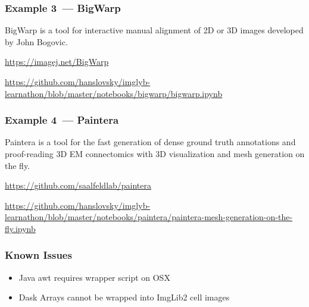 \documentclass[%
]{beamer}
\newcommand{\urlScrSz}[1]{\scriptsize\url{#1}}
\begin{document}
\begin{frame}
    \frametitle{Example 3~--- BigWarp}
    BigWarp is a tool for interactive manual alignment of 2D or 3D images developed by John Bogovic.

    \urlScrSz{https://imagej.net/BigWarp}

    \urlScrSz{https://github.com/hanslovsky/imglyb-learnathon/blob/master/notebooks/bigwarp/bigwarp.ipynb}
\end{frame}

\begin{frame}
    \frametitle{Example 4~--- Paintera}
    Paintera is a tool for the fast generation of dense ground truth annotations and proof-reading
    3D EM connectomics with 3D visualization and mesh generation on the fly.

    \urlScrSz{https://github.com/saalfeldlab/paintera}

    \urlScrSz{https://github.com/hanslovsky/imglyb-learnathon/blob/master/notebooks/paintera/paintera-mesh-generation-on-the-fly.ipynb}
\end{frame}

\begin{frame}
    \frametitle{Known Issues}
    \begin{itemize}
          \item Java awt requires wrapper script on OSX
          \item Dask Arrays cannot be wrapped into ImgLib2 cell images
    \end{itemize}
\end{frame}
\end{document}

